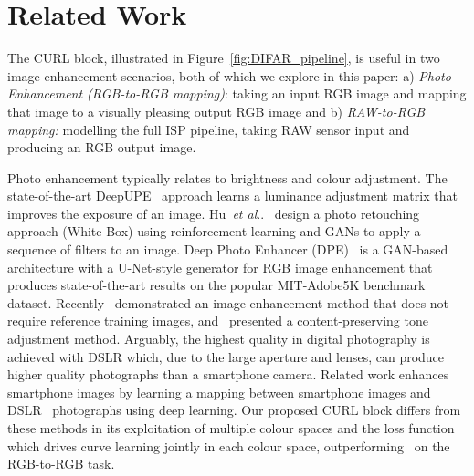 \documentclass[a4paper,conference]{IEEEtran}
\makeatletter
\DeclareRobustCommand\onedot{\futurelet\@let@token\@onedot} \def\@onedot{\ifx\@let@token.\else.\null\fi\xspace}
\def\etal{\emph{et al}\onedot}
\makeatother
\begin{document}
\section{Related Work}

The CURL block, illustrated in Figure~\ref{fig:DIFAR_pipeline}, is useful in two image enhancement scenarios, both of which we explore in this paper: a) {\em Photo Enhancement (RGB-to-RGB mapping)}: taking an input RGB image and mapping that image to a visually pleasing output RGB image and b) {\em RAW-to-RGB mapping:} modelling the full ISP pipeline, taking RAW sensor input and producing an RGB output image. 

Photo enhancement typically relates to brightness and colour adjustment. The state-of-the-art DeepUPE~\cite{wang19} approach learns a luminance adjustment matrix that improves the exposure of an image. Hu~\etal~\cite{hu2018} design a photo retouching approach (White-Box) using reinforcement learning and GANs to apply a sequence of filters to an image. Deep Photo Enhancer (DPE)~\cite{Chen2018DPE} is a GAN-based architecture with a U-Net-style generator for RGB image enhancement that produces state-of-the-art results on the popular MIT-Adobe5K benchmark dataset. Recently~\cite{GuoCVPR2020} demonstrated an image enhancement method that does not require reference training images, and~\cite{BiancoCVPRW2019} presented a content-preserving tone adjustment method. Arguably, the highest quality in digital photography is achieved with DSLR which, due to the large aperture and lenses, can produce higher quality photographs than 
a smartphone camera. Related work enhances smartphone images by learning a mapping between smartphone images and DSLR~\cite{IgnatovICCV2017,zoom_CVPR2019} photographs using deep learning. Our proposed CURL block differs from these methods in its exploitation of multiple colour spaces and the loss function which drives curve learning jointly in each colour space, outperforming~\cite{wang19,Chen2018DPE,IgnatovICCV2017} on the RGB-to-RGB task.
\end{document}
